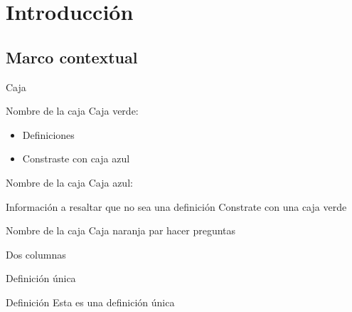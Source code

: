 \section{Introducción}

\subsection{Marco contextual}

\begin{frame}{Caja}
  \begin{Block}{Nombre de la caja}
    Caja verde:
    \begin{itemize}
      \item Definiciones
      \item Constraste con caja azul
    \end{itemize}
  \end{Block}
  \begin{BlueBlock}{Nombre de la caja}
    Caja azul:
    \begin{itemize}
      \Bitem Información a resaltar que no sea una definición
      \Bitem Constrate con una caja verde
    \end{itemize}
  \end{BlueBlock}
  \begin{AlertBlock}{Nombre de la caja}
    Caja naranja par hacer preguntas
  \end{AlertBlock} 
\end{frame}

\begin{frame}{Dos columnas}
  \begin{twocols}
  \end{twocols}
\end{frame}

\begin{frame}{Definición única}
  \centering
  \begin{singledef}{Definición}
    Esta es una definición única
  \end{singledef}
\end{frame}


